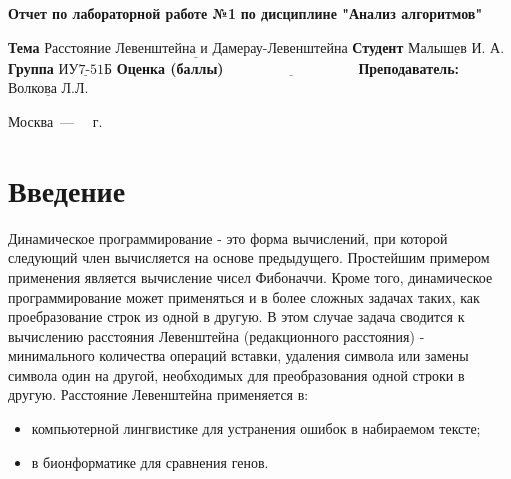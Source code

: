 \documentclass{report}
\begin{document}
\begin{titlepage}
	
	\begin{center}
		\noindent\begin{minipage}{1.3\textwidth}\centering
			\Large\textbf{  Отчет по лабораторной работе №1}\newline
			\textbf{по дисциплине "Анализ алгоритмов"}\newline\newline
		\end{minipage}
	\end{center}
	
	\noindent\textbf{Тема} $\underline{\text{Расстояние Левенштейна и Дамерау-Левенштейна}}$\newline\newline
	\noindent\textbf{Студент} $\underline{\text{Малышев И. А.}}$\newline\newline
	\noindent\textbf{Группа} $\underline{\text{ИУ7-51Б}}$\newline\newline
	\noindent\textbf{Оценка (баллы)} $\underline{\text{~~~~~~~~~~~~~~~~~~~~~~~~~~~}}$\newline\newline
	\noindent\textbf{Преподаватель: } $\underline{\text{Волкова Л.Л.}}$\newline\newline\newline
	
	\begin{center}
		\vfill
		Москва~---~\the\year
		~г.
	\end{center}
\end{titlepage}


\tableofcontents
  
\newpage
\chapter*{Введение}


Динамическое программирование - это форма вычислений, при которой следующий член вычисляется на основе предыдущего. Простейшим примером применения является вычисление чисел Фибоначчи. Кроме того, динамическое программирование может применяться и в более сложных задачах таких, как проебразование строк из одной в другую. В этом случае задача сводится к вычислению расстояния Левенштейна (редакционного расстояния) - минимального количества операций вставки, удаления символа или замены символа один на другой, необходимых для преобразования одной строки в другую. Расстояние Левенштейна применяется в:
\begin{itemize}
\item компьютерной лингвистике для устранения  ошибок в набираемом тексте;
\item в бионформатике для сравнения генов.
\end{itemize}
\end{document}
